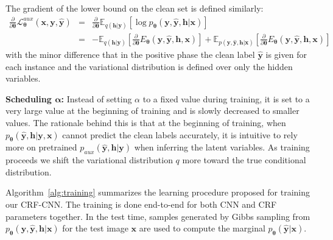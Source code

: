 \documentclass{article}
\newcommand{\x}{{\pmb{x}}}
\newcommand{\y}{{\pmb{y}}}
\newcommand{\yh}{{\hat{\pmb{y}}}}
\newcommand{\h}{{\pmb{h}}}
\newcommand{\btheta}{{\pmb{\theta}}}
\renewcommand{\L}{{\mathcal{L}}}
\begin{document}

The gradient of the lower bound on the clean set is defined similarly:
\begin{eqnarray}
\frac{\partial}{\partial \btheta} \L^{aux}_{\btheta}(\x, \y, \yh) &=& \frac{\partial}{\partial \btheta} \mathbb{E}_{q(\h|\y)} [\log p_\btheta(\y, \yh, \h|\x)] \nonumber \\
&=& - \mathbb{E}_{q(\h|\y)} [\frac{\partial}{\partial \btheta} E_\btheta(\y, \yh, \h, \x)] 
+ \mathbb{E}_{p(\y, \yh, \h | \x)} [\frac{\partial}{\partial \btheta}  E_\btheta(\y, \yh, \h, \x)]  \label{eq:grad_loss_clean}
\end{eqnarray}
with the minor difference that in the positive phase the clean label $\yh$ is given for each instance and the variational distribution is defined over only the hidden variables.

\textbf{Scheduling $\pmb{\alpha}$:} Instead of setting $\alpha$ to a fixed value during training, it is set to a very large value at the beginning of training and is slowly decreased to smaller values.
The rationale behind this is that at the beginning of training, when $p_\btheta(\yh, \h| \y, \x)$ cannot predict the clean labels accurately, it is intuitive to rely more on pretrained $p_{aux}(\yh, \h| \y)$ 
when inferring the latent variables. As training proceeds we shift the variational distribution $q$ more toward the true conditional distribution.

Algorithm~\ref{alg:training} summarizes the learning procedure proposed for training our CRF-CNN. The training is done end-to-end for both CNN and CRF parameters together. 
In the test time, samples generated by Gibbs sampling from $p_\btheta(\y, \yh, \h | \x)$ for the test image $\x$ are used to compute the marginal $p_\btheta(\yh| \x)$. 
\end{document}
